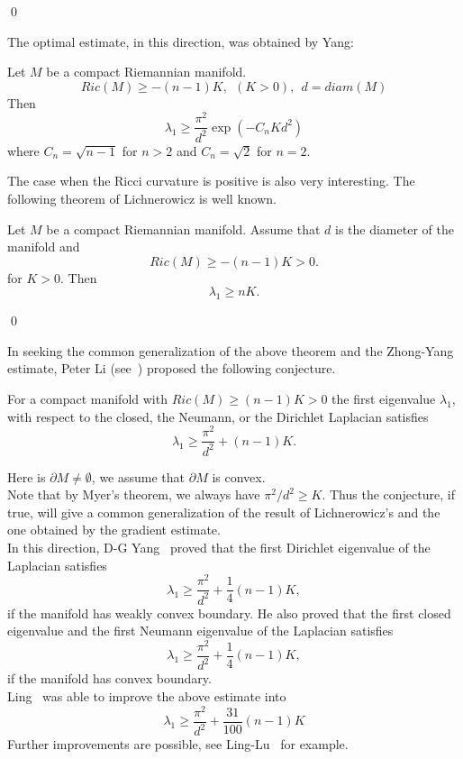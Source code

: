 \qed



The optimal estimate, in this direction, was obtained by Yang:
\begin{theorem}
Let $M$ be a compact Riemannian manifold. 
\[
Ric(M) \geqslant -(n-1)K,\ \ (K > 0),\ \ d = diam(M)
\]
Then
\[
\lambda_1 \geqslant \frac{\pi^2}{d^2}\exp(-C_n K d^2)
\]
where $C_n = \sqrt{n-1}$ for $n>2$ and $C_n = \sqrt{2}$ for $n=2$.
\end{theorem}

The case when the Ricci curvature is positive is also very interesting. The
following theorem of Lichnerowicz is well known.
\begin{theorem}
Let $M$ be a compact Riemannian manifold. Assume that $d$ is the diameter of the manifold and 
\[
Ric(M) \geqslant - (n-1) K > 0.
\]
for $K>0$. Then
\[
\lambda_1 \geqslant nK.
\]
\end{theorem}

\qed



In seeking the common generalization of the above theorem and the Zhong-Yang
estimate, Peter Li (see~\cite{yangd}) proposed the following conjecture.
\begin{conjecture}
For a compact manifold with $Ric(M) \geqslant (n-1)K > 0$ the first eigenvalue
$\lambda_1$, with respect to the closed, the Neumann, or the Dirichlet Laplacian
satisfies
\[
\lambda_1 \geqslant \frac{\pi^2}{d^2} + (n-1)K.
\]
\end{conjecture}
Here is $\partial M \neq \emptyset$, we assume that $\partial M$ is convex.
\\

Note that by Myer's theorem, we always have $\pi^2/d^2 \geqslant K$. Thus the
conjecture, if true, will give a common generalization of the result of
Lichnerowicz's and the one obtained by the gradient estimate.
\\

In this direction, D-G Yang~\cite{yangd} proved that the first Dirichlet eigenvalue of the
Laplacian satisfies
\[
\lambda_1 \geqslant \frac{\pi^2}{d^2} + \frac{1}{4}(n-1)K,
\]
if the manifold has weakly convex boundary. He also proved that the first closed
eigenvalue and the first Neumann eigenvalue of the Laplacian satisfies
\[
\lambda_1 \geqslant \frac{\pi^2}{d^2} + \frac{1}{4}(n-1)K,
\]
if the manifold has convex boundary.
\\

Ling~\cite{ling} was able to improve the above estimate into
\[
\lambda_1 \geqslant \frac{\pi^2}{d^2} + \frac{31}{100}(n-1)K
\]
Further improvements are possible, see Ling-Lu~\cite{ling-lu} for example.
\\

